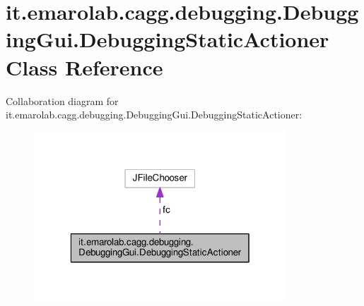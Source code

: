 \hypertarget{classit_1_1emarolab_1_1cagg_1_1debugging_1_1DebuggingGui_1_1DebuggingStaticActioner}{\section{it.\-emarolab.\-cagg.\-debugging.\-Debugging\-Gui.\-Debugging\-Static\-Actioner Class Reference}
\label{classit_1_1emarolab_1_1cagg_1_1debugging_1_1DebuggingGui_1_1DebuggingStaticActioner}
}


Collaboration diagram for it.\-emarolab.\-cagg.\-debugging.\-Debugging\-Gui.\-Debugging\-Static\-Actioner\-:
\nopagebreak
\begin{figure}[H]
\begin{center}
\leavevmode
\includegraphics[width=268pt]{classit_1_1emarolab_1_1cagg_1_1debugging_1_1DebuggingGui_1_1DebuggingStaticActioner__coll__graph}
\end{center}
\end{figure}
